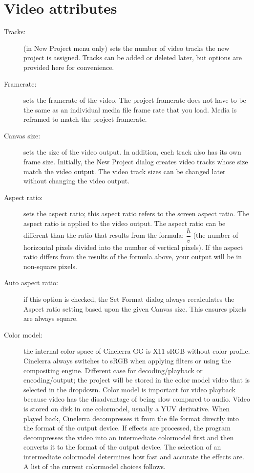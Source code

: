 \section{Video attributes}%
\label{sec:video_attributes}

\begin{description}
    \item[Tracks:]
        (in New Project menu only) sets the number of video tracks the new project is assigned. 
        Tracks can be added or deleted later, but options are provided here for convenience.

    \item[Framerate:]
        sets the framerate of the video. 
        The project framerate does not have to be the same as an individual media file frame rate that you load. 
        Media is reframed to match the project framerate.

    \item[Canvas size:]
        sets the size of the video output. 
        In addition, each track also has its own frame size. 
        Initially, the New Project dialog creates video tracks whose size match the video output. 
        The video    track sizes can be changed later without changing the video output.

    \item[Aspect ratio:]
        sets the aspect ratio; this aspect ratio refers to the screen aspect ratio. 
        The aspect ratio is applied to the video output. 
        The aspect ratio can be different than the ratio that results from the formula: $\dfrac{h}{v}$ (the number of horizontal pixels divided into the number of vertical pixels). 
        If the aspect ratio differs from the results of the formula above, your output will be in non-square pixels. 

    \item[Auto aspect ratio:]
        if this option is checked, the Set Format dialog always recalculates the Aspect ratio setting based upon the given Canvas size. This ensures pixels are always square.

    \item[Color model:]
        the internal color space of Cinelerra GG is X11 sRGB without color profile. Cinelerra always switches to sRGB when applying filters or using the compositing engine. Different case for decoding/playback or encoding/output; the project will be stored in the color model video that is selected in the dropdown.  
        Color model is important for video playback because video has the disadvantage of being slow compared to audio.  
        Video is stored on disk in one colormodel, usually a YUV derivative. 
        When played back, Cinelerra decompresses it from the file format directly into the format of the output device. 
        If effects are processed, the program decompresses the video into an intermediate colormodel first and then converts it to the format of the output device. 
        The selection of an intermediate colormodel determines how fast and accurate the effects are.  
        A list of the current colormodel choices follows.


\end{description}
